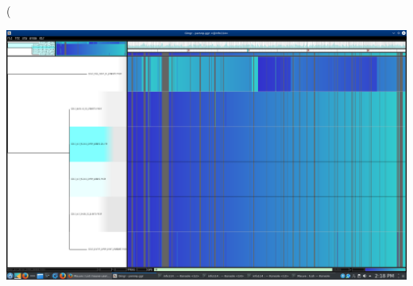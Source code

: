 \left( \documentclass[12pt]{article}
\newcommand{\smel}{\textit{S.\,meliloti}\xspace}
\newcommand{\strep}{\textit{Streptomyces}\xspace}
\newcommand{\bass}{\textit{B.\,subtilis}\xspace}
\newcommand{\ecol}{\textit{E.\,coli}\xspace}
\begin{document}
\includegraphics[width=\textwidth]{Parsnp_aln_pic_17Dec18.png}


%		

%
%
\end{document}
